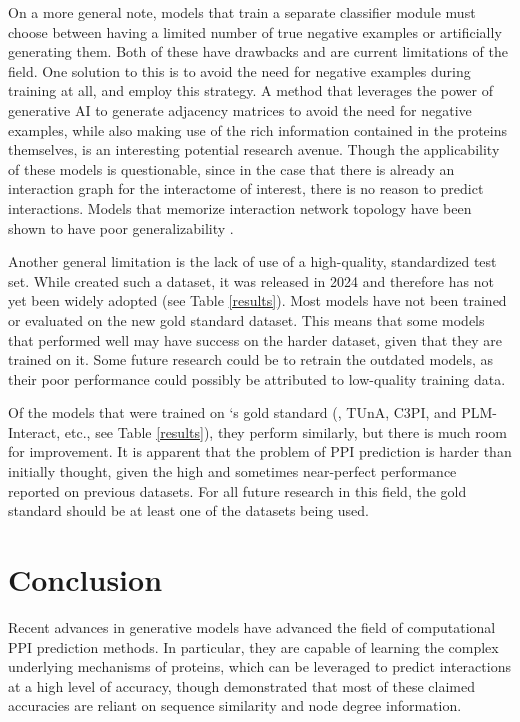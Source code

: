 \documentclass{article}
\begin{document}
On a more general note, models that train a separate classifier module must choose between having a limited number of true negative examples or artificially generating them. Both of these have drawbacks and are current limitations of the field. One solution to this is to avoid the need for negative examples during training at all, \citet{xiao_highly-confident_2021} and \citet{balogh_efficient_2022} employ this strategy. A method that leverages the power of generative AI to generate adjacency matrices to avoid the need for negative examples, while also making use of the rich information contained in the proteins themselves, is an interesting potential research avenue. Though the applicability of these models is questionable, since in the case that there is already an interaction graph for the interactome of interest, there is no reason to predict interactions. Models that memorize interaction network topology have been shown to have poor generalizability \citep{bernett_cracking_2024}.

Another general limitation is the lack of use of a high-quality, standardized test set. While \citet{bernett_cracking_2024} created such a dataset, it was released in 2024 and therefore has not yet been widely adopted (see Table \ref{results}). Most models have not been trained or evaluated on the new gold standard dataset. This means that some models that performed well may have success on the harder dataset, given that they are trained on it. Some future research could be to retrain the outdated models, as their poor performance could possibly be attributed to low-quality training data.

Of the models that were trained on \citet{bernett_cracking_2024}`s gold standard (\citet{sledzieski_democratizing_2024}, TUnA, C3PI, and PLM-Interact, etc., see Table \ref{results}), they perform similarly, but there is much room for improvement. It is apparent that the problem of PPI prediction is harder than initially thought, given the high and sometimes near-perfect performance reported on previous datasets. For all future research in this field, the \citet{bernett_cracking_2024} gold standard should be at least one of the datasets being used.

\section{Conclusion}
Recent advances in generative models have advanced the field of computational PPI prediction methods. In particular, they are capable of learning the complex underlying mechanisms of proteins, which can be leveraged to predict interactions at a high level of accuracy, though \citet{bernett_cracking_2024} demonstrated that most of these claimed accuracies are reliant on sequence similarity and node degree information.
\end{document}
